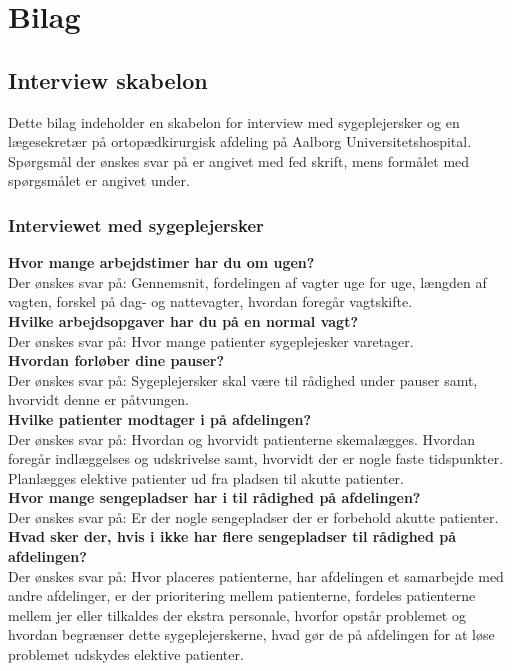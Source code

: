 \chapter{Bilag}

\section{Interview skabelon} \label{bilagA}
Dette bilag indeholder en skabelon for interview med sygeplejersker og en lægesekretær på ortopædkirurgisk afdeling på Aalborg Universitetshospital. Spørgsmål der ønskes svar på er angivet med fed skrift, mens formålet med spørgsmålet er angivet under. 

\subsection{Interviewet med sygeplejersker}
\textbf{Hvor mange arbejdstimer har du om ugen?} \\
\noindent
Der ønskes svar på: Gennemsnit, fordelingen af vagter uge for uge, længden af vagten, forskel på dag- og nattevagter, hvordan foregår vagtskifte. \\
\noindent
\textbf{Hvilke arbejdsopgaver har du på en normal vagt?} \\
\noindent
Der ønskes svar på: Hvor mange patienter sygeplejesker varetager. \\
\noindent
\textbf{Hvordan forløber dine pauser?} \\
\noindent
Der ønskes svar på: Sygeplejersker skal være til rådighed under pauser samt, hvorvidt denne er påtvungen. \\
\noindent
\textbf{Hvilke patienter modtager i på afdelingen?} \\
\noindent
Der ønskes svar på: Hvordan og hvorvidt patienterne skemalægges. Hvordan foregår indlæggelses og udskrivelse samt, hvorvidt der er nogle faste tidspunkter. Planlægges elektive patienter ud fra pladsen til akutte patienter.  \\
\noindent
\textbf{Hvor mange sengepladser har i til rådighed på afdelingen?}  \\
\noindent
Der ønskes svar på: Er der nogle sengepladser der er forbehold akutte patienter. \\
\noindent
\textbf{Hvad sker der, hvis i ikke har flere sengepladser til rådighed på afdelingen?} \\
\noindent
Der ønskes svar på: Hvor placeres patienterne, har afdelingen et samarbejde med andre afdelinger, er der prioritering mellem patienterne, fordeles patienterne mellem jer eller tilkaldes der ekstra personale, hvorfor opstår problemet og hvordan begrænser dette sygeplejerskerne, hvad gør de på afdelingen for at løse problemet udskydes elektive patienter. \\
